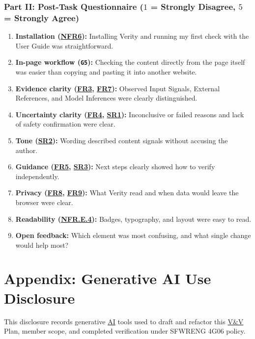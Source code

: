 \documentclass[12pt, titlepage]{article}
\newcommand{\AI}{\hyperlink{vnv-acr-ai}{AI}}
\newcommand{\VnV}{\hyperlink{vnv-acr-vnv}{V\&V}}
\begin{document}
\subsubsection*{Part II: Post-Task Questionnaire ($1$ = Strongly Disagree, $5$ = Strongly Agree)}
\begin{enumerate}[leftmargin=*, itemsep=0.5pt, topsep=2pt, label=\textbf{Q\arabic*.}]
    \item \textbf{Installation (\hyperref[req:NFR6]{NFR6}):} Installing Verity and running my first check with the User Guide was straightforward.
    \item \textbf{In-page workflow (\texttt{G5}):} Checking the content directly from the page itself was easier than copying and pasting it into another website.
    \item \textbf{Evidence clarity (\hyperref[req:FR3]{FR3}, \hyperref[req:FR7]{FR7}):} Observed Input Signals, External References, and Model Inferences were clearly distinguished.
    \item \textbf{Uncertainty clarity (\hyperref[req:FR4]{FR4}, \hyperref[req:SR1]{SR1}):} Inconclusive or failed reasons and lack of safety confirmation were clear.
    \item \textbf{Tone (\hyperref[req:SR2]{SR2}):} Wording described content signals without accusing the author.
    \item \textbf{Guidance (\hyperref[req:FR5]{FR5}, \hyperref[req:SR3]{SR3}):} Next steps clearly showed how to verify independently.
    \item \textbf{Privacy (\hyperref[req:FR8]{FR8}, \hyperref[req:FR9]{FR9}):} What Verity read and when data would leave the browser were clear.
    \item \textbf{Readability (\hyperref[req:NFR.E.4]{NFR.E.4}):} Badges, typography, and layout were easy to read.
    \item \textbf{Open feedback:} Which element was most confusing, and what single change would help most?
\end{enumerate}

\section{Appendix: Generative AI Use Disclosure}\label{sec:genai-disclosure}

This disclosure records generative \AI{} tools used to draft and refactor this \VnV{} Plan, member scope, and completed verification under SFWRENG 4G06 policy.
\end{document}
